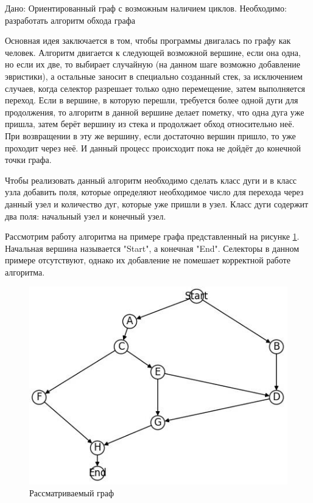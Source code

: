 \def\notedate{2023.02.01}
\def\currentauthor{Журавлев Н.В. (РК6-72Б)}

\begin{task}
Дано: Ориентированный граф с возможным наличием циклов.
Необходимо: разработать алгоритм обхода графа
\end{task}

Основная идея заключается в том, чтобы программы двигалась по графу как человек. Алгоритм двигается к следующей возможной вершине, если она одна, но если их две, то выбирает случайную (на данном шаге возможно добавление эвристики), а остальные заносит в специально созданный стек, за исключением случаев, когда селектор разрешает только одно перемещение, затем выполняется переход. Если в вершине, в которую перешли, требуется более одной дуги для продолжения, то алгоритм в данной вершине делает пометку, что одна дуга уже пришла, затем берёт вершину из стека и продолжает обход относительно неё. При возвращении в эту же вершину, если достаточно вершин пришло, то уже проходит через неё. И данный процесс происходит пока не дойдёт до конечной точки графа.

Чтобы реализовать данный алгоритм необходимо сделать класс дуги и в класс узла добавить поля, которые определяют необходимое число для перехода через данный узел и количество дуг, которые уже пришли в узел. Класс дуги содержит два поля: начальный узел и конечный узел. 

Рассмотрим работу алгоритма на примере графа представленный на рисунке \ref{fig:graph}. Начальная вершина называется "Start", а конечная "End". Селекторы в данном примере отсутствуют, однако их добавление не помешает корректной работе алгоритма.

\begin{figure}[h]
    \centering
    \includegraphics[width=0.6\linewidth]{ResearchNotes/rndhpc_alg_edt_2023_02_01/graph.jpg}
    \caption{Рассматриваемый граф}
    \label{fig:graph}
\end{figure} 

